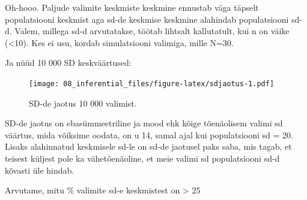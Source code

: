 \documentclass[]{book}
\newenvironment{Shaded}{\begin{snugshade}}{\end{snugshade}}
\newcommand{\CommentTok}[1]{\textcolor[rgb]{0.56,0.35,0.01}{\textit{#1}}}
\newcommand{\ControlFlowTok}[1]{\textcolor[rgb]{0.13,0.29,0.53}{\textbf{#1}}}
\newcommand{\DataTypeTok}[1]{\textcolor[rgb]{0.13,0.29,0.53}{#1}}
\newcommand{\DecValTok}[1]{\textcolor[rgb]{0.00,0.00,0.81}{#1}}
\newcommand{\KeywordTok}[1]{\textcolor[rgb]{0.13,0.29,0.53}{\textbf{#1}}}
\newcommand{\NormalTok}[1]{#1}
\newcommand{\OperatorTok}[1]{\textcolor[rgb]{0.81,0.36,0.00}{\textbf{#1}}}
\newcommand{\StringTok}[1]{\textcolor[rgb]{0.31,0.60,0.02}{#1}}
\begin{document}
Oh-hooo. Paljude valimite keskmiste keskmine ennustab väga täpselt populatsiooni keskmist aga sd-de keskmise keskmine alahindab populatsiooni sd-d. Valem, millega sd-d arvutatakse, töötab lihtsalt kallutatult, kui n on väike (\textless{}10). Kes ei usu, kordab simulatsiooni valimiga, mille N=30.

Ja nüüd 10 000 SD keskväärtused:



\begin{Shaded}
\end{Shaded}

\begin{figure}
\centering
\texttt{[image: 08\_inferential\_files/figure-latex/sdjaotus-1.pdf]}
\caption{\label{fig:sdjaotus}SD-de jaotus 10 000 valimist.}
\end{figure}

\begin{Shaded}
\end{Shaded}

SD-de jaotus on ebasümmeetriline ja mood ehk kõige tõenäolisem valimi sd väärtus, mida võiksime oodata, on u 14, samal ajal kui populatsiooni sd = 20.
Lisaks alahinnatud keskmisele sd-le on sd-de jaotusel paks saba, mis tagab, et teisest küljest pole ka vähetõenäoline, et meie valimi sd populatsiooni sd-d kõvasti üle hindab.

Arvutame, mitu \% valimite sd-e keskmistest on \textgreater{} 25

\begin{Shaded}
\end{Shaded}
\end{document}
